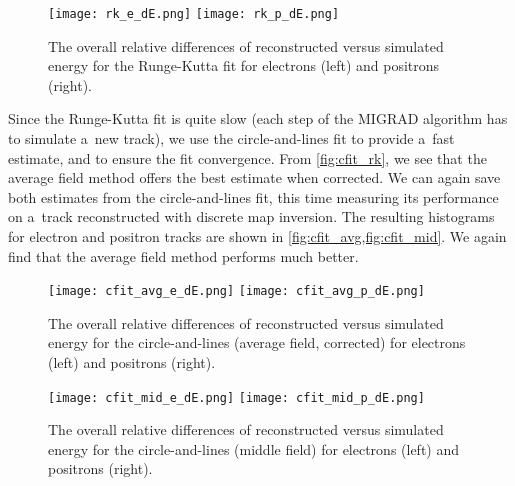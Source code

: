 			\begin{figure}
				\centering
				\texttt{[image: rk\_e\_dE.png]}
				\hfill
				\texttt{[image: rk\_p\_dE.png]}
				\caption{The overall relative differences of reconstructed versus simulated energy for the Runge-Kutta fit for electrons (left) and positrons (right).}
				\label{fig:rk_dE}
			\end{figure}
			
			Since the Runge-Kutta fit is quite slow (each step of the MIGRAD algorithm has to simulate a~new track), we use the circle-and-lines fit to provide a~fast estimate, and to ensure the fit convergence. From \cref{fig:cfit_rk}, we see that the average field method offers the best estimate when corrected. We can again save both estimates from the circle-and-lines fit, this time measuring its performance on a~track reconstructed with discrete map inversion. The resulting histograms for electron and positron tracks are shown in \cref{fig:cfit_avg,fig:cfit_mid}. We again find that the average field method performs much better.
			
			\begin{figure}
				\centering
				\texttt{[image: cfit\_avg\_e\_dE.png]}
				\hfill
				\texttt{[image: cfit\_avg\_p\_dE.png]}
				\caption{The overall relative differences of reconstructed versus simulated energy for the circle-and-lines (average field, corrected) for electrons (left) and positrons (right).}
				\label{fig:cfit_avg}
			\end{figure}
			
			\begin{figure}
				\centering
				\texttt{[image: cfit\_mid\_e\_dE.png]}
				\hfill
				\texttt{[image: cfit\_mid\_p\_dE.png]}
				\caption{The overall relative differences of reconstructed versus simulated energy for the circle-and-lines (middle field) for electrons (left) and positrons (right).}
				\label{fig:cfit_mid}
			\end{figure}